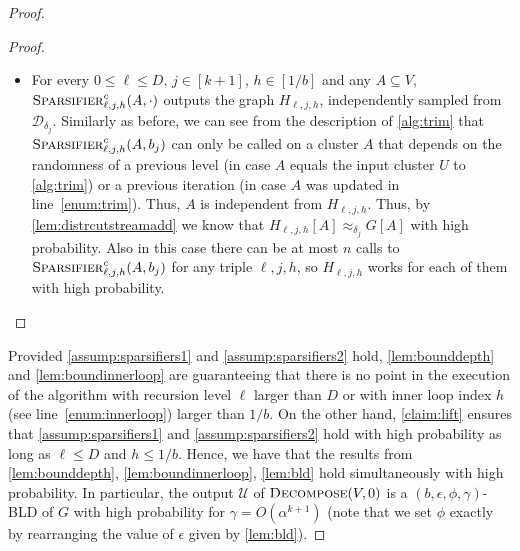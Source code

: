 \documentclass[epsfig,letter,11pt]{article}
\numberwithin{equation}{section}
\newcommand{\ed}{\textsc{Decompose}}
\begin{document}
\begin{proof}
\begin{proof}
\begin{itemize}
			\item For every $0 \le \ell \le D,\,j \in[k+1],\,h \in [1/b]$ and any $A \subseteq V$, $\textsc{Sparsifier}^c_{\ell,j,h}(A,\cdot)$ outputs the graph $H_{\ell,j,h}$, independently sampled from $\mathcal{D}_{\delta_j}$. Similarly as before, we can see from the description of \cref{alg:trim} that $\textsc{Sparsifier}^c_{\ell,j,h}(A,b_j)$ can only be called on a cluster $A$ that depends on the randomness of a previous level (in case $A$ equals the input cluster $U$ to \cref{alg:trim}) or a previous iteration (in case $A$ was updated in line~\eqref{enum:trim}). Thus, $A$ is independent from $H_{\ell,j,h}$. Thus, by \cref{lem:distrcutstreamadd} we know that $H_{\ell,j,h}[A] \approx_{\delta_j} G[A]$ with high probability. Also in this case there can be at most $n$ calls to $\textsc{Sparsifier}^c_{\ell,j,h}(A,b_j)$ for any triple $\ell,j,h$, so $H_{\ell,j,h}$ works for each of them with high probability.
		\end{itemize}
	\end{proof}
	\noindent
	Provided  \cref{assump:sparsifiers1} and \cref{assump:sparsifiers2} hold, \cref{lem:bounddepth} and \cref{lem:boundinnerloop} are guaranteeing that there is no point in the execution of the algorithm with recursion level $\ell$ larger than $D$ or with inner loop index $h$ (see line~\eqref{enum:innerloop}) larger than $1/b$. On the other hand, \cref{claim:lift} ensures that \cref{assump:sparsifiers1} and \cref{assump:sparsifiers2} hold with high probability as long as $\ell \le D$ and $h \le 1/b$. Hence, we have that the results from \cref{lem:bounddepth}, \cref{lem:boundinnerloop}, \cref{lem:bld} hold simultaneously with high probability. In particular, the output $\mathcal{U}$ of $\ed(V,0)$
	is a $(b,\epsilon,\phi,\gamma)$-BLD of $G$ with high probability for $\gamma = O(\alpha^{k+1})$ (note that we set $\phi$ exactly by rearranging the value of $\epsilon$ given by \cref{lem:bld}).
	

\end{proof}
\end{document}
